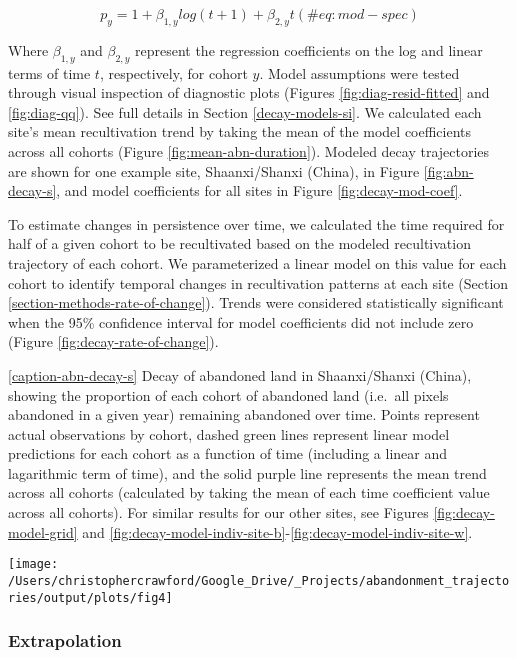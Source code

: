 \documentclass[9pt,twocolumn,twoside,]{pnas-new}
\begin{document}
\begin{equation}
p_{y} = 1 + \beta_{1,y} log(t + 1) + \beta_{2,y} t (\#eq:mod-spec)
\end{equation}

Where \(\beta_{1,y}\) and \(\beta_{2,y}\) represent the regression
coefficients on the log and linear terms of time \(t\), respectively,
for cohort \(y\). Model assumptions were tested through visual
inspection of diagnostic plots (Figures \ref{fig:diag-resid-fitted} and
\ref{fig:diag-qq}). See full details in Section \ref{decay-models-si}.
We calculated each site's mean recultivation trend by taking the mean of
the model coefficients across all cohorts (Figure
\ref{fig:mean-abn-duration}). Modeled decay trajectories are shown for
one example site, Shaanxi/Shanxi (China), in Figure
\ref{fig:abn-decay-s}, and model coefficients for all sites in Figure
\ref{fig:decay-mod-coef}.

To estimate changes in persistence over time, we calculated the time
required for half of a given cohort to be recultivated based on the
modeled recultivation trajectory of each cohort. We parameterized a
linear model on this value for each cohort to identify temporal changes
in recultivation patterns at each site (Section
\ref{section-methods-rate-of-change}). Trends were considered
statistically significant when the 95\% confidence interval for model
coefficients did not include zero (Figure
\ref{fig:decay-rate-of-change}).

\ref{caption-abn-decay-s} Decay of abandoned land in Shaanxi/Shanxi
(China), showing the proportion of each cohort of abandoned land
(i.e.~all pixels abandoned in a given year) remaining abandoned over
time. Points represent actual observations by cohort, dashed green lines
represent linear model predictions for each cohort as a function of time
(including a linear and lagarithmic term of time), and the solid purple
line represents the mean trend across all cohorts (calculated by taking
the mean of each time coefficient value across all cohorts). For similar
results for our other sites, see Figures \ref{fig:decay-model-grid} and
\ref{fig:decay-model-indiv-site-b}-\ref{fig:decay-model-indiv-site-w}.

\begin{figure*}
\texttt{[image: /Users/christophercrawford/Google\_Drive/\_Projects/abandonment\_trajectories/output/plots/fig4]} 
\caption{\ref{caption-abn-decay-s}}
\label{fig:abn-decay-s}
\end{figure*}

\hypertarget{extrapolation}{%
\subsubsection{Extrapolation}\label{extrapolation}}
\end{document}
